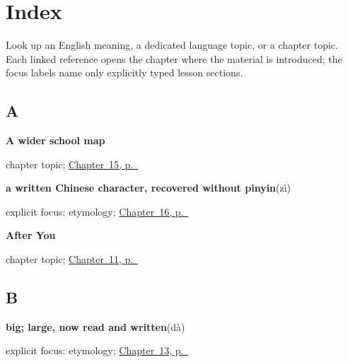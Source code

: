 
\chapter*{Index}

Look up an English meaning, a dedicated language topic, or a chapter topic. Each linked reference opens the chapter where the material is introduced; the focus labels name only explicitly typed lesson sections.

\section*{A}

\noindent\begin{minipage}[t]{\linewidth}
\raggedright
\textbf{A wider school map}\par
\footnotesize chapter topic; \hyperref[ch:zh-school-compounds]{Chapter~15, p.~\pageref*{ch:zh-school-compounds}}
\end{minipage}\par\smallskip

\noindent\begin{minipage}[t]{\linewidth}
\raggedright
\textbf{a written Chinese character, recovered without pinyin}\enspace\emph{}\enspace(zì)\par
\footnotesize explicit focus: etymology; \hyperref[ch:zh-language-identity]{Chapter~16, p.~\pageref*{ch:zh-language-identity}}
\end{minipage}\par\smallskip

\noindent\begin{minipage}[t]{\linewidth}
\raggedright
\textbf{After You}\par
\footnotesize chapter topic; \hyperref[ch:zh-qing]{Chapter~11, p.~\pageref*{ch:zh-qing}}
\end{minipage}\par\smallskip

\section*{B}

\noindent\begin{minipage}[t]{\linewidth}
\raggedright
\textbf{big; large, now read and written}\enspace\emph{}\enspace(dà)\par
\footnotesize explicit focus: etymology; \hyperref[ch:zh-school-six]{Chapter~13, p.~\pageref*{ch:zh-school-six}}
\end{minipage}\par\smallskip

